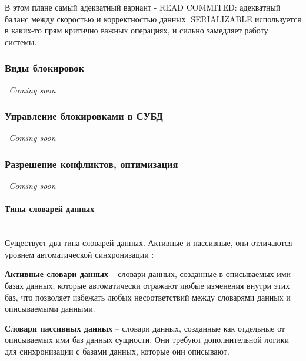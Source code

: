 В этом плане самый адекватный вариант - READ COMMITED: адекватный баланс между скоростью и корректностью данных. SERIALIZABLE используется в каких-то прям критично важных операциях, и сильно замедляет работу системы.

\subsubsection{Виды блокировок}

\textit{~Coming soon}

\subsubsection{Управление блокировками в СУБД}

\textit{~Coming soon}

\subsubsection{Разрешение конфликтов, оптимизация}

\textit{~Coming soon}
















\paragraph{Типы словарей данных} ~\\

Существует два типа словарей данных. Активные и пассивные, они отличаются уровнем автоматической синхронизации \autocite{DataDictionary}:

\begin{grayquote}
    \textbf{Активные словари данных} -- словари данных, созданные в описываемых ими базах данных, которые автоматически отражают любые изменения внутри этих баз, что позволяет избежать любых несоответствий между словарями данных и описываемыми данными.
\end{grayquote}

\begin{grayquote}
    \textbf{Словари пассивных данных} -- словари данных, созданные как отдельные от описываемых ими баз данных сущности. Они требуют дополнительной логики для синхронизации с базами данных, которые они описывают.
\end{grayquote}

